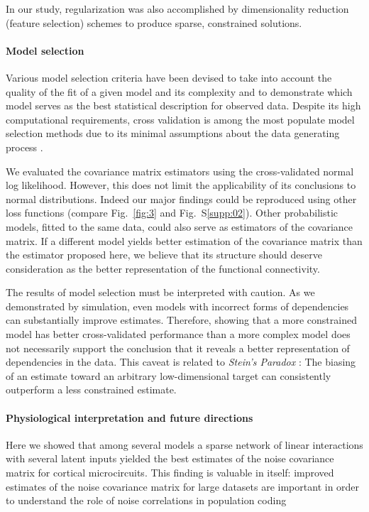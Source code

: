 \documentclass[10pt]{article}
\begin{document}
In our study, regularization was also accomplished by dimensionality reduction (feature selection) schemes to produce sparse, constrained solutions.


\paragraph{Model selection}
Various model selection criteria have been devised to take into account the quality of the fit of a given model and its complexity and to demonstrate which model serves as the best statistical description for observed data. Despite its high computational requirements, cross validation is among the most populate model selection methods due to its minimal assumptions about the data generating process \cite{Arlot:2010}.

We evaluated the covariance matrix estimators using the cross-validated normal log likelihood.  However, this does not limit the applicability of its conclusions to normal distributions. Indeed our major findings could be reproduced using other loss functions (compare Fig.~\ref{fig:3} and Fig.~S\ref{supp:02}).  Other probabilistic models, fitted to the same data, could also serve as estimators of the covariance matrix.  If a different model yields better estimation of the covariance matrix than the estimator proposed here, we believe that its structure should deserve consideration as the better representation of the functional connectivity.

The results of model selection must be interpreted with caution.  As we demonstrated by simulation, even models with incorrect forms of dependencies can substantially improve estimates.  Therefore, showing that a more constrained model has better cross-validated performance than a more complex model does not necessarily support the conclusion that it reveals a better representation of dependencies in the data.  This caveat is related to \emph{Stein's Paradox} \cite{Efron:1977}: The biasing of an estimate toward an arbitrary low-dimensional target can consistently outperform a less constrained estimate.

\paragraph{Physiological interpretation and future directions}

Here we showed that among several models a sparse network of linear interactions with several latent inputs yielded the best estimates of the noise covariance matrix for cortical microcircuits.  This finding is valuable in itself: improved estimates of the noise covariance matrix for large datasets are important in order to understand the role of noise correlations in population coding \cite{Abbott:1999, Sompolinsky:2001, Averbeck:2006, Ecker:2011}  
\end{document}
